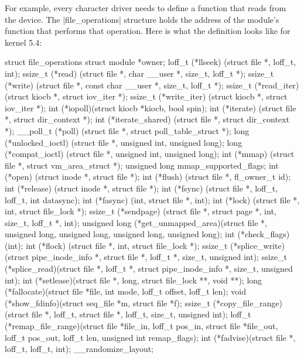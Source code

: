 \documentclass[10pt, oneside]{book}
\begin{document}
For example, every character driver needs to define a function that reads from the device.
The \cpp|file_operations| structure holds the address of the module's function that performs that operation.
Here is what the definition looks like for kernel 5.4:

\begin{code}
struct file_operations {
    struct module *owner;
    loff_t (*llseek) (struct file *, loff_t, int);
    ssize_t (*read) (struct file *, char __user *, size_t, loff_t *);
    ssize_t (*write) (struct file *, const char __user *, size_t, loff_t *);
    ssize_t (*read_iter) (struct kiocb *, struct iov_iter *);
    ssize_t (*write_iter) (struct kiocb *, struct iov_iter *);
    int (*iopoll)(struct kiocb *kiocb, bool spin);
    int (*iterate) (struct file *, struct dir_context *);
    int (*iterate_shared) (struct file *, struct dir_context *);
    __poll_t (*poll) (struct file *, struct poll_table_struct *);
    long (*unlocked_ioctl) (struct file *, unsigned int, unsigned long);
    long (*compat_ioctl) (struct file *, unsigned int, unsigned long);
    int (*mmap) (struct file *, struct vm_area_struct *);
    unsigned long mmap_supported_flags;
    int (*open) (struct inode *, struct file *);
    int (*flush) (struct file *, fl_owner_t id);
    int (*release) (struct inode *, struct file *);
    int (*fsync) (struct file *, loff_t, loff_t, int datasync);
    int (*fasync) (int, struct file *, int);
    int (*lock) (struct file *, int, struct file_lock *);
    ssize_t (*sendpage) (struct file *, struct page *, int, size_t, loff_t *, int);
    unsigned long (*get_unmapped_area)(struct file *, unsigned long, unsigned long, unsigned long, unsigned long);
    int (*check_flags)(int);
    int (*flock) (struct file *, int, struct file_lock *);
    ssize_t (*splice_write)(struct pipe_inode_info *, struct file *, loff_t *, size_t, unsigned int);
    ssize_t (*splice_read)(struct file *, loff_t *, struct pipe_inode_info *, size_t, unsigned int);
    int (*setlease)(struct file *, long, struct file_lock **, void **);
    long (*fallocate)(struct file *file, int mode, loff_t offset,
        loff_t len);
    void (*show_fdinfo)(struct seq_file *m, struct file *f);
    ssize_t (*copy_file_range)(struct file *, loff_t, struct file *,
        loff_t, size_t, unsigned int);
    loff_t (*remap_file_range)(struct file *file_in, loff_t pos_in,
             struct file *file_out, loff_t pos_out,
             loff_t len, unsigned int remap_flags);
    int (*fadvise)(struct file *, loff_t, loff_t, int);
} __randomize_layout;
\end{code}
\end{document}
